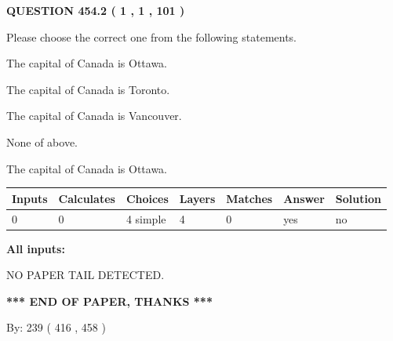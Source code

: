 \documentclass[12pt]{article}
\begin{document}
   
  
\vspace{0.2in}
  
{\textbf{\Large{QUESTION
454.2 
 ( 1 , 1 , 101 )
}}}
  
  
Please choose the correct one from the following statements.
 
 
The capital of Canada is Ottawa.
 
 
The capital of Canada is Toronto.
 
 
The capital of Canada is Vancouver.
 
 
 None of above.
 
 
\noindent{}
 
 
The capital of Canada is Ottawa.
 
 
\noindent{}
 
 
   
   
   
   
\noindent\begin{tabular}{|l|l|l|l|l|l|l|}
 \hline
Inputs & Calculates & Choices & Layers & Matches & Answer & Solution \\ \hline
 0  & 
 0  & 
 4
  simple  
  & 
 4  & 
 0  & 
  yes & 
  no 
  \\ \hline
 \end{tabular}
   
   
   
   
\noindent{}
   
   
   
   
\noindent\vspace{0.1in}\hspace{-0.08in} {\textbf{\Large{All inputs: }}}
   
   
   
   
\vspace{2.0in} NO PAPER TAIL DETECTED.
   
   
   
   
\vspace{1.0in} 
{\textbf{\large{ *** END OF PAPER, THANKS *** }}} 
   
   
\hspace{1.0in} By: 
 239 ( 416 ,  458 )
   
\end{document}
